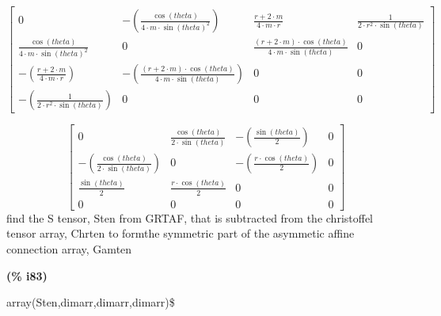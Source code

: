 \documentclass[fleqn]{article}
\begin{document}
\[\tag{\% o81} 
\begin{bmatrix}0 & \mathop{-}\left( \frac{\cos{(theta)}}{4\mathop{\ensuremath{\cdot}}m\mathop{\ensuremath{\cdot}}{{\sin{(theta)}}^{2}}}\right)  & \frac{r\mathop{+}2\mathop{\ensuremath{\cdot}}m}{4\mathop{\ensuremath{\cdot}}m\mathop{\ensuremath{\cdot}}r} & \frac{1}{2\mathop{\ensuremath{\cdot}}{{r}^{2}}\mathop{\ensuremath{\cdot}}\sin{(theta)}}\\
\frac{\cos{(theta)}}{4\mathop{\ensuremath{\cdot}}m\mathop{\ensuremath{\cdot}}{{\sin{(theta)}}^{2}}} & 0 & \frac{\left( r\mathop{+}2\mathop{\ensuremath{\cdot}}m\right) \mathop{\ensuremath{\cdot}}\cos{(theta)}}{4\mathop{\ensuremath{\cdot}}m\mathop{\ensuremath{\cdot}}\sin{(theta)}} & 0\\
\mathop{-}\left( \frac{r\mathop{+}2\mathop{\ensuremath{\cdot}}m}{4\mathop{\ensuremath{\cdot}}m\mathop{\ensuremath{\cdot}}r}\right)  & \mathop{-}\left( \frac{\left( r\mathop{+}2\mathop{\ensuremath{\cdot}}m\right) \mathop{\ensuremath{\cdot}}\cos{(theta)}}{4\mathop{\ensuremath{\cdot}}m\mathop{\ensuremath{\cdot}}\sin{(theta)}}\right)  & 0 & 0\\
\mathop{-}\left( \frac{1}{2\mathop{\ensuremath{\cdot}}{{r}^{2}}\mathop{\ensuremath{\cdot}}\sin{(theta)}}\right)  & 0 & 0 & 0\end{bmatrix}\mbox{}\]

\[\tag{\% o82} 
\begin{bmatrix}0 & \frac{\cos{(theta)}}{2\mathop{\ensuremath{\cdot}}\sin{(theta)}} & \mathop{-}\left( \frac{\sin{(theta)}}{2}\right)  & 0\\
\mathop{-}\left( \frac{\cos{(theta)}}{2\mathop{\ensuremath{\cdot}}\sin{(theta)}}\right)  & 0 & \mathop{-}\left( \frac{r\mathop{\ensuremath{\cdot}}\cos{(theta)}}{2}\right)  & 0\\
\frac{\sin{(theta)}}{2} & \frac{r\mathop{\ensuremath{\cdot}}\cos{(theta)}}{2} & 0 & 0\\
0 & 0 & 0 & 0\end{bmatrix}\mbox{}
\]
find the S tensor, Sten from GRTAF, that is subtracted from the christoffel tensor array, Chrten to formthe symmetric part of the asymmetic affine connection array, Gamten


\noindent
\begin{minipage}[t]{4.000000em}\color{red}\bfseries
(\% i83)	
\end{minipage}
\begin{minipage}[t]{\textwidth}\color{blue}
array(Sten,dimarr,dimarr,dimarr)\$
\end{minipage}
\end{document}
